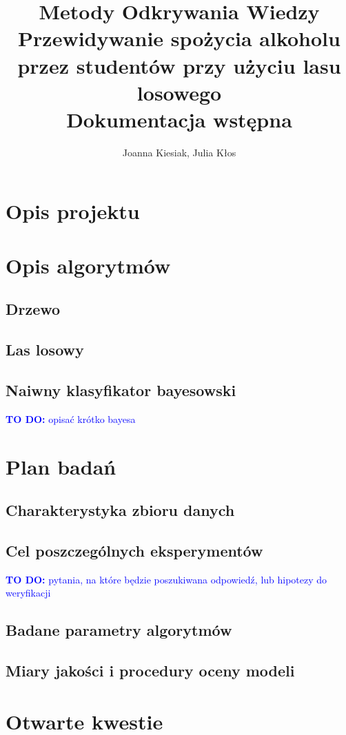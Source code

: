 \documentclass{article}
\title{{\normalfont Metody Odkrywania Wiedzy}\vspace{0.2cm} \\ 
Przewidywanie spożycia alkoholu przez studentów przy użyciu lasu losowego\\
\vspace{0.2cm}
\large{\normalfont Dokumentacja wstępna}}
\author{
Joanna Kiesiak, Julia Kłos\\

}
\newcommand{\todo}[1]{\textcolor{blue}{\textbf{TO DO:} #1}}
\begin{document}
\maketitle

\section{Opis projektu}

\section{Opis algorytmów}
\subsection{Drzewo}

\subsection{Las losowy}

\subsection{Naiwny klasyfikator bayesowski}

\todo{opisać krótko bayesa}
\section{Plan badań}
\subsection{Charakterystyka zbioru danych}

\subsection{Cel poszczególnych eksperymentów}
\todo{pytania, na które będzie poszukiwana odpowiedź, lub hipotezy do weryfikacji}
\subsection{Badane parametry algorytmów}
\subsection{Miary jakości i procedury oceny modeli}
\section{Otwarte kwestie}


\end{document}

